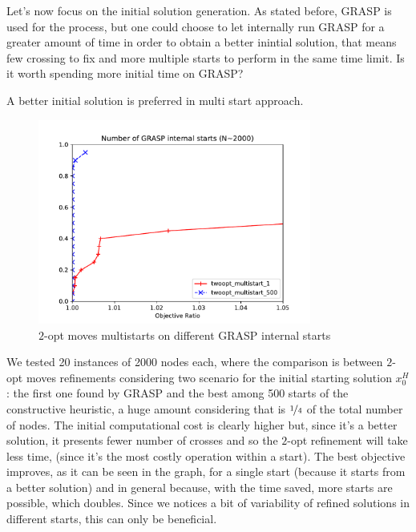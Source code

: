 Let's now focus on the initial solution generation. As stated before, GRASP is
used for the process, but one could choose to let internally run GRASP for a
greater amount of time in order to obtain a better inintial solution, that means
few crossing to fix and more multiple starts to perform in the same time limit.
Is it worth spending more initial time on GRASP?

\begin{claim}
    A better initial solution is preferred in multi start approach.
\end{claim}

\begin{figure}[h]
    \centering
    \includegraphics[width=0.8\textwidth]{figures/grasp_starts.pdf}
    \caption{$2$-opt moves multistarts on different GRASP internal starts}
\end{figure}

We tested 20 instances of 2000 nodes each, where the comparison is between
$2$-opt moves refinements considering two scenario for the initial starting
solution $x^H_0$: the first one found by GRASP and the best among 500 starts of
the constructive heuristic, a huge amount considering that is $\nicefrac{1}{4}$
of the total number of nodes. The initial computational cost is clearly higher
but, since it's a better solution, it presents fewer number of crosses and so
the $2$-opt refinement will take less time, (since it's the most costly
operation within a start). The best objective improves, as it can be seen in the
graph, for a single start (because it starts from a better solution) and in
general because, with the time saved, more starts are possible, which doubles.
Since we notices a bit of variability of refined solutions in different starts,
this can only be beneficial.
